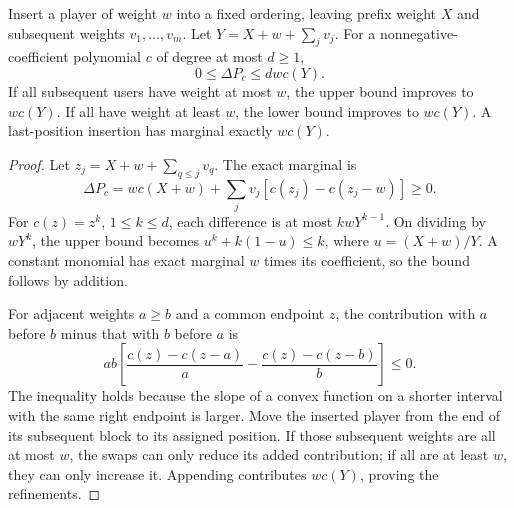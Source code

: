\documentclass[manuscript,review,anonymous]{acmart}
\begin{document}
\begin{lemma}\label{lem:ordered}
Insert a player of weight $w$ into a fixed ordering, leaving prefix weight $X$ and subsequent weights $v_1,\ldots,v_m$. Let $Y=X+w+\sum_jv_j$. For a nonnegative-coefficient polynomial $c$ of degree at most $d\ge1$,
\[
 0\le\Delta P_c\le dwc(Y).
\]
If all subsequent users have weight at most $w$, the upper bound improves to $wc(Y)$. If all have weight at least $w$, the lower bound improves to $wc(Y)$. A last-position insertion has marginal exactly $wc(Y)$.
\end{lemma}
\begin{proof}
Let $z_j=X+w+\sum_{q\le j}v_q$. The exact marginal is
\[
 \Delta P_c=wc(X+w)+\sum_jv_j[c(z_j)-c(z_j-w)]\ge0.
\]
For $c(z)=z^k$, $1\le k\le d$, each difference is at most $kwY^{k-1}$. On dividing by $wY^k$, the upper bound becomes $u^k+k(1-u)\le k$, where $u=(X+w)/Y$. A constant monomial has exact marginal $w$ times its coefficient, so the bound follows by addition.

For adjacent weights $a\ge b$ and a common endpoint $z$, the contribution with $a$ before $b$ minus that with $b$ before $a$ is
\begin{equation}\label{eq:swap}
 ab\left[\frac{c(z)-c(z-a)}a-\frac{c(z)-c(z-b)}b\right]\le0.
\end{equation}
The inequality holds because the slope of a convex function on a shorter interval with the same right endpoint is larger. Move the inserted player from the end of its subsequent block to its assigned position. If those subsequent weights are all at most $w$, the swaps can only reduce its added contribution; if all are at least $w$, they can only increase it. Appending contributes $wc(Y)$, proving the refinements.
\end{proof}
\end{document}
